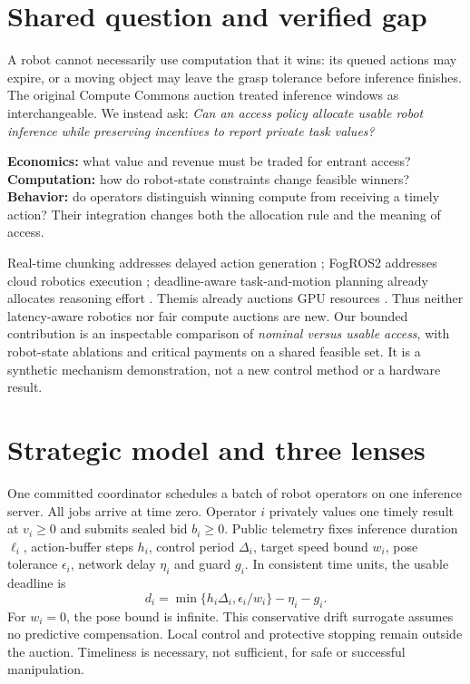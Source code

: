 \section{Shared question and verified gap}
A robot cannot necessarily use computation that it wins: its queued actions may expire, or a moving object may leave the grasp tolerance before inference finishes. The original Compute Commons auction treated inference windows as interchangeable. We instead ask: \emph{Can an access policy allocate usable robot inference while preserving incentives to report private task values?}

\textbf{Economics:} what value and revenue must be traded for entrant access? \textbf{Computation:} how do robot-state constraints change feasible winners? \textbf{Behavior:} do operators distinguish winning compute from receiving a timely action? Their integration changes both the allocation rule and the meaning of access.

Real-time chunking addresses delayed action generation \cite{rtc}; FogROS2 addresses cloud robotics execution \cite{fogros}; deadline-aware task-and-motion planning already allocates reasoning effort \cite{sung}. Themis already auctions GPU resources \cite{themis}. Thus neither latency-aware robotics nor fair compute auctions are new. Our bounded contribution is an inspectable comparison of \emph{nominal versus usable access}, with robot-state ablations and critical payments on a shared feasible set. It is a synthetic mechanism demonstration, not a new control method or a hardware result.

\section{Strategic model and three lenses}
One committed coordinator schedules a batch of robot operators on one inference server. All jobs arrive at time zero. Operator $i$ privately values one timely result at $v_i\geq0$ and submits sealed bid $b_i\geq0$. Public telemetry fixes inference duration $\ell_i$, action-buffer steps $h_i$, control period $\Delta_i$, target speed bound $w_i$, pose tolerance $\epsilon_i$, network delay $\eta_i$ and guard $g_i$. In consistent time units, the usable deadline is
\begin{equation}\label{eq:deadline}
d_i=\min\{h_i\Delta_i,\epsilon_i/w_i\}-\eta_i-g_i.
\end{equation}
For $w_i=0$, the pose bound is infinite. This conservative drift surrogate assumes no predictive compensation. Local control and protective stopping remain outside the auction. Timeliness is necessary, not sufficient, for safe or successful manipulation.

